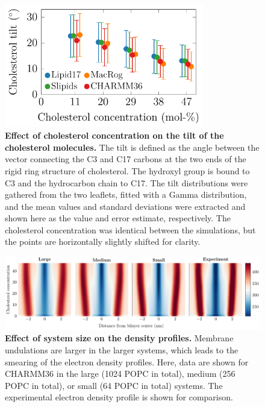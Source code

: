 \documentclass[journal=jpcbfk]{achemso}
\begin{document}
\begin{figure}[htb!]
    \centering
    \includegraphics[width=8.7cm]{../FIGS/choltilt.pdf}
    \caption{\label{SIfig:choltilt}%
     \textbf{Effect of cholesterol concentration on the tilt of the cholesterol molecules.}
     The tilt is defined as the angle between the vector connecting the C3 and C17 carbons at the two ends of the rigid ring structure of cholesterol. The hydroxyl group is bound to C3 and the hydrocarbon chain to C17. The tilt distributions were gathered from the two leaflets, fitted with a Gamma distribution, and the mean values and standard deviations were extracted and shown here as the value and error estimate, respectively. The cholesterol concentration was identical between the simulations, but the points are horizontally slightly shifted for clarity.
    }
\end{figure}

\begin{figure}[htb!]
    \centering
    \includegraphics[width=\linewidth]{../FIGS/densityprofiles_size.pdf}
    \caption{\label{SIfig:densprofssize}%
    \textbf{Effect of system size on the density profiles.}
    Membrane undulations are larger in the larger systems, which leads to the smearing of the electron density profiles. Here, data are shown for CHARMM36 in the large (1024 POPC in total), medium (256 POPC in total), or small (64 POPC in total) systems. The experimental electron density profile is shown for comparison.
    }
\end{figure}
\end{document}
